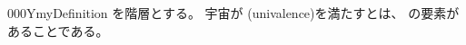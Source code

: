 \documentclass[index]{subfiles}
\begin{document}
\begin{myBlock}{000Y}{myDefinition}
  を階層とする。
  宇宙が
  (univalence)を満たすとは、
  の要素があることである。
\end{myBlock}
\end{document}
